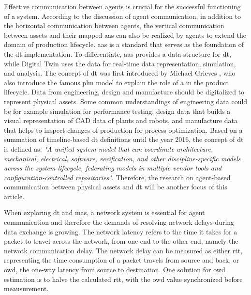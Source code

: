 Effective communication between agents is crucial for the successful functioning of a 
system\cite{georgeff_communication_1988}. According to the discussion of agent 
communication\cite{vogel-heuser_multi-agent_2020}, in addition to the horizontal 
communication between agents, the vertical communication between assets 
and their mapped \gls{aas} can also be realized by agents to extend the domain 
of production lifecycle. \gls{aas} is a standard 
that serves as the foundation of the \gls{dt} implementation\cite{redeker_towards_2021}. 
To differentiate, \gls{aas} provides a data structure for \gls{dt}, while Digital 
Twin uses the data for real-time data representation, simulation, and analysis. 
The concept of \gls{dt} was first introduced by Michael 
Grieves \cite{flumerfelt_complex_2019}, who also introduce the 
famous \gls{plm} model \cite{greengard_digital_nodate}to 
explain the role of a in the product lifecycle. Data from engineering, 
design and manufacture should be digitalized to represent physical 
assets. Some common understandings of engineering data could be 
for example simulation for performance testing, design data 
that builds a visual representation of CAD data of plants and robots, 
and manufacture data that helps to inspect changes of production for 
process optimization. 
Based on a summation of timeline-based \gls{dt} definitions until the year 
2016\cite{negri_review_2017}, the concept of \gls{dt} is defined as: \textit{"A 
unified system model that can coordinate architecture, mechanical, electrical, 
software, verification, and other discipline-specific models across the system 
lifecycle, federating models in multiple vendor tools and configuration-controlled 
repositories"}\cite{bajaj_architecture_2016}. Therefore, the research on agent-based 
communication between physical assets and \gls{dt} will be another focus of this 
article. 


When exploring \gls{dt} and \gls{mas}, a network system is essential for agent communication 
and therefore the demands of resolving network delays during data exchange is growing. The network 
latency refers to the time it takes for a packet to travel across the network, from one end 
to the other end, namely the netwotk communication delay. The network delay can be measured 
as either \gls{rtt}, representing the time consumption of a packet travels from source and 
back, or \gls{owd}, the one-way latency from source to 
destination. One solution for \gls{owd} estimation\cite{abdou_accurate_2015} is 
to halve the calculated \gls{rtt}\cite{karn_improving_nodate}, with the \gls{owd} 
value synchronized before meausurement\cite{abdou_accurate_2015}. 


